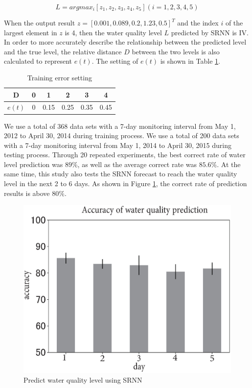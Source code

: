\documentclass[runningheads]{llncs}
\begin{document}
\begin{equation}
L=argmax_i[z_1,z_2,z_3,z_4,z_5 ](i=1,2,3,4,5)
\end{equation}

When the output result $z = [0.001, 0.089, 0.2, 1.23, 0.5]^T$ and the index $i$ of 
the largest element in $z$ is 4, then the water quality level $L$ predicted by SRNN is IV. 
In order to more accurately describe the relationship between the predicted 
level and the true level, the relative distance $D$ between the two levels 
is also calculated to represent $e(t)$. The setting of $e(t)$ is shown in Table \ref{Training error setting}.
\begin{table}[htbp] 
\centering
\caption{Training error setting}
\label{Training error setting}
\begin{tabular}{cccccc} 
\toprule 
D&0&1&2&3&4\\ 
\midrule 
$e(t)$&0&0.15&0.25&0.35&0.45\\ 
\bottomrule 
\end{tabular} 
\end{table}

We use a total of 368 data sets with a 7-day monitoring interval from May 1,
2012 to April 30, 2014 during training process. We use a total of 200 data sets with a 
7-day monitoring interval from May 1, 2014 to April 30, 2015 during testing process. 
Through 20 repeated experiments, the best correct rate of water level prediction was $89\%$,
as well as the average correct rate was $85.6\%$. At the same time, 
this study also tests the SRNN forecast to reach the water quality
level in the next 2 to 6 days.  As shown in Figure \ref{Predict water quality level using SRNN}, the correct rate of prediction 
results is above $80\%$.

\begin{figure}[htbp]
\centering
\includegraphics[width=\columnwidth]{Predict_water_quality}
\caption{Predict water quality level using SRNN}
\label{Predict water quality level using SRNN}
\end{figure}
\end{document}
